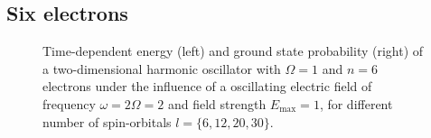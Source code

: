 \subsection*{Six electrons}

\begin{figure}[!h]
    \centering
    \caption{Time-dependent energy (left) and ground state probability (right)
        of a two-dimensional harmonic oscillator with $\Omega=1$
        and $n=6$ electrons under the influence of a oscillating electric field 
        of frequency $\omega = 2 \Omega = 2$ and field strength $E_\text{max}=1$,
        for different number of spin-orbitals $l=\{6,12,20,30\}$.
    }
    \label{fig:2d_n6_qd}
\end{figure}

